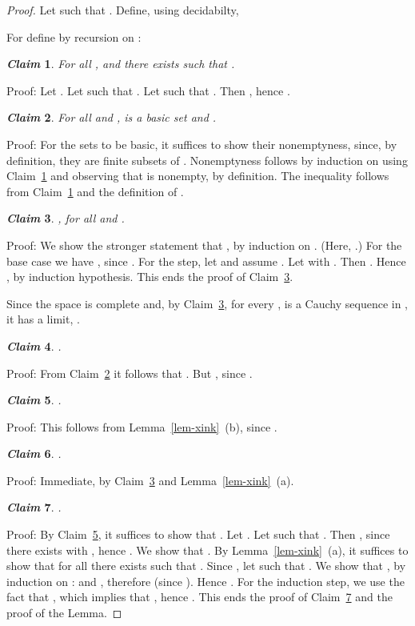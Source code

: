 \documentclass[microtype]{jloganal}
\newtheorem{claim}{\it Claim}
\theoremstyle{plain}
\theoremstyle{definition}
\begin{document}
\begin{proof}
Let  such that . 
Define, using decidabilty,

For  define  by recursion on :

\begin{claim}
\label{claim-split-cdn}
For all ,  and   there exists 
such that .
\end{claim}
Proof: Let .
Let  such that .
Let  such that .
Then , hence .

\begin{claim}
\label{claim-split-cdn-cauchy}
For all  and ,  is a basic set and 
.
\end{claim}
Proof: For the sets  to be basic, it suffices to show their nonemptyness, since,
by definition, they are finite subsets of . Nonemptyness follows by induction
on  using Claim~\ref{claim-split-cdn} and observing that  is nonempty,
by definition.
The inequality  follows from 
Claim~\ref{claim-split-cdn} and the definition of .

\begin{claim}
\label{claim-split-cdn-subxd}
, for all  and .
\end{claim}
Proof:
We show the stronger statement that 
, by induction on . (Here, .)
For the base case we have  
,
since .
For the step, let  and assume .
Let  with . Then 
. Hence ,
by induction hypothesis.
This ends the proof of Claim~\ref{claim-split-cdn-subxd}.

Since the space  is complete and, by 
Claim~\ref{claim-split-cdn-subxd}, for every ,  is a 
Cauchy sequence in , it has a limit, .
\begin{claim}
\label{claim-split-cdnk}
.
\end{claim}
Proof: From Claim~\ref{claim-split-cdn-cauchy} it follows that 
. But , since .

\begin{claim}
\label{claim-split-kdsubk}
.
\end{claim}
Proof: This follows from Lemma~\ref{lem-xink}~(b), since .


\begin{claim}
\label{claim-split-kdsubxd}
.
\end{claim}
Proof: Immediate, by Claim~\ref{claim-split-cdn-subxd} and Lemma~\ref{lem-xink}~(a).

\begin{claim}
\label{claim-split-union}
.
\end{claim}
Proof: By Claim~\ref{claim-split-kdsubk}, it suffices to show that
.
Let . Let  such that .
Then , since there exists  with 
, hence 
.
We show that .
By Lemma~\ref{lem-xink}~(a), it suffices to show that for all  there
exists  such that .
Since , let  such that 
.
We show that , by induction on :  and 
, therefore 
 (since 
). Hence .
For the induction step, we use the fact that , which
implies that , hence .
This ends the proof of Claim~\ref{claim-split-union} and the proof of the Lemma.
\end{proof}
\end{document}
